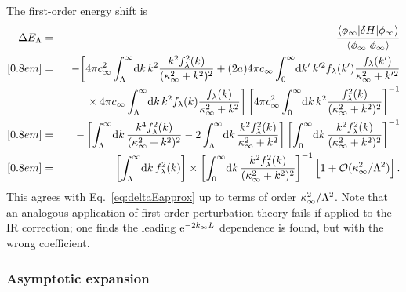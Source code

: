 	The first-order energy shift is
	\begin{eqnarray}
	 \Delta\ELam
	 &=& \frac{\langle\phiinf|\delta H | \phiinf\rangle}
	   {\langle\phiinf|\phiinf\rangle}
	 \nonumber \\ [0.8em]
	 &=& -\biggl[
	  4\pi \cinf^2 \int_\Lambda^\infty\! \dd k\, k^2 \frac{k^2\flam^2(k)}
	  {(\kapinf^2 + k^2)^2}
	  + (2a)4\pi \cinf \int_0^\infty\! \dd k'\, k'^{2}
	  \flam(k')\frac{\flam(k')}{\kapinf^2 + k'{}^2}
	  \nonumber \\
	  & &\qquad\null
	  \times 4\pi\cinf \int_\Lambda^\infty\! \dd k\, k^2 \flam(k)\frac{\flam(k)}
	  {\kapinf^2 + k^2}
	 \biggr]
	 \left[4\pi \cinf^2\int_{0}^{\infty}\! \dd k\, k^2
	  \frac{\flam^2(k)}{(\kapinf^2 + k^2)^2} \right]^{-1}
	 \nonumber \\ [0.8em]
	 &=& -\left[
	  \int_\Lambda^\infty\! \dd k\, \frac{k^4\flam^2(k)}{(\kapinf^2 + k^2)^2}
	   - 2 \int_\Lambda^\infty\! \dd k\,  \frac{k^2\flam^2(k)}{\kapinf^2 + k^2}
	   \right]
	   \left[\int_{0}^{\infty}\! \dd k\,
	   \frac{k^2 \flam^2(k)}{(\kapinf^2 + k^2)^2} \right]^{-1}
	 \nonumber \\ [0.8em]
	 &=& \left[
	     \int_\Lambda^\infty\! \dd k\, \flam^2(k)
	   \right]
	   \times \left[\int_{0}^{\infty}\! \dd k\, \frac{k^2 \flam^2(k)}
	   {(\kapinf^2 + k^2)^2} \right]^{-1}
	  \Big[1+ {\mathcal O}(\kapinf^2/\Lambda^2)\Big] \,.
	\end{eqnarray}
	This agrees with Eq.~\eqref{eq:deltaEapprox} up to terms of order
	$\kappa_{\infty}^2/\Lambda^2$.
	Note that an analogous application of first-order perturbation theory
	fails if applied to the IR correction; one finds the leading
	$\mathrm{e}^{-2k_{\infty} L}$ dependence is found, but with the wrong coefficient.

	\medskip
	\subsubsection{Asymptotic expansion}


